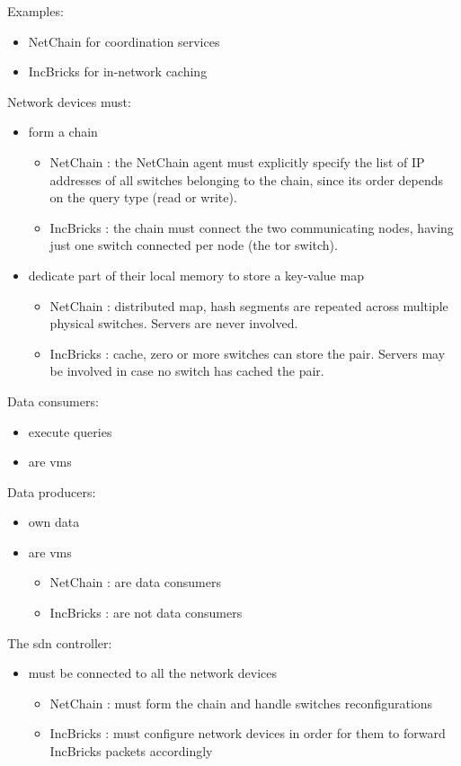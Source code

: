 Examples:
\begin{itemize}
    \item NetChain \cite{netchain} for coordination services
    \item IncBricks \cite{incbricks} for in-network caching
\end{itemize}
Network devices must:
\begin{itemize}
    \item form a chain
    \begin{itemize}
        \item NetChain \cite{netchain}: the NetChain \cite{netchain} agent must explicitly specify the list of IP addresses of all switches belonging to the chain, since its order depends on the query type (read or write).
        \item IncBricks \cite{incbricks}: the chain must connect the two communicating nodes, having just one switch connected per node (the \gls{tor} switch).
    \end{itemize}
    \item dedicate part of their local memory to store a key-value map
    \begin{itemize}
        \item NetChain \cite{netchain}: distributed map, hash segments are repeated across multiple physical switches. Servers are never involved.
        \item IncBricks \cite{incbricks}: cache, zero or more switches can store the pair. Servers may be involved in case no switch has cached the pair.
    \end{itemize}
\end{itemize}
Data consumers:
\begin{itemize}
    \item execute queries
    \item are \glspl{vm}
\end{itemize}
Data producers:
\begin{itemize}
    \item own data
    \item are \glspl{vm}
    \begin{itemize}
        \item NetChain \cite{netchain}: are data consumers
        \item IncBricks \cite{incbricks}: are not data consumers
    \end{itemize}
\end{itemize}
The \gls{sdn} controller:
\begin{itemize}
    \item must be connected to all the network devices
    \begin{itemize}
        \item NetChain \cite{netchain}: must form the chain and handle switches reconfigurations
        \item IncBricks \cite{incbricks}: must configure network devices in order for them to forward IncBricks \cite{incbricks} packets accordingly
    \end{itemize}
\end{itemize}